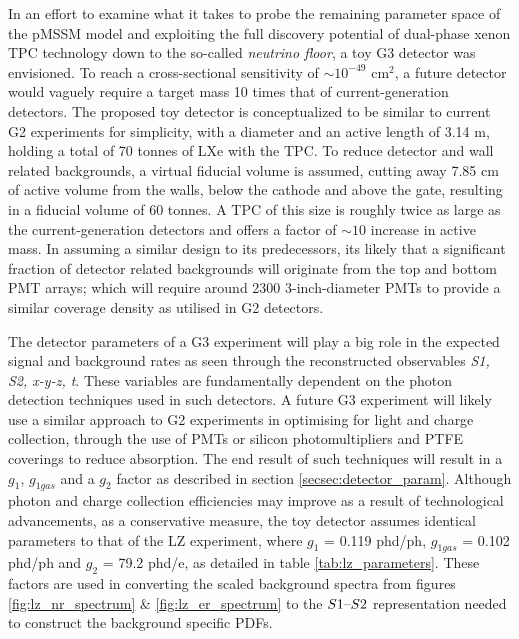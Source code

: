 In an effort to examine what it takes to probe the remaining parameter space of the pMSSM model and exploiting the full discovery potential of dual-phase xenon TPC technology down to the so-called \textit{neutrino floor}, a toy G3 detector was envisioned. To reach a cross-sectional sensitivity of $\sim10^{-49}$ cm$^{2}$, a future detector would vaguely require a target mass 10 times that of current-generation detectors. The proposed toy detector is conceptualized to be similar to current G2 experiments for simplicity, with a diameter and an active length of 3.14 m, holding a total of 70 tonnes of LXe with the TPC. To reduce detector and wall related backgrounds, a virtual fiducial volume is assumed, cutting away 7.85 cm of active volume from the walls, below the cathode and above the gate, resulting in a fiducial volume of 60 tonnes. A TPC of this size is roughly twice as large as the current-generation detectors and offers a factor of $\sim10$ increase in active mass. In assuming a similar design to its predecessors, its likely that a significant fraction of detector related backgrounds will originate from the top and bottom PMT arrays; which will require around 2300 3-inch-diameter PMTs to provide a similar coverage density as utilised in G2 detectors. 

The detector parameters of a G3 experiment will play a big role in the expected signal and background rates as seen through the reconstructed observables \textit{S1, S2, x-y-z, t}. These variables are fundamentally dependent on the photon detection techniques used in such detectors. A future G3 experiment will likely use a similar approach to G2 experiments in optimising for light and charge collection, through the use of PMTs or silicon photomultipliers \cite{Gundacker_2020} and PTFE coverings to reduce absorption. The end result of such techniques will result in a $g_{1}$, $g_{1gas}$ and a $g_{2}$ factor as described in section \ref{secsec:detector_param}. Although photon and charge collection efficiencies may improve as a result of technological advancements, as a conservative measure, the toy detector assumes identical parameters to that of the LZ experiment, where $g_{1}$ = 0.119 phd/ph, $g_{1gas}$ = 0.102 phd/ph and $g_{2}$ = 79.2 phd/e, as detailed in table \ref{tab:lz_parameters}. These factors are used in converting the scaled background spectra from figures \ref{fig:lz_nr_spectrum} \& \ref{fig:lz_er_spectrum} to the $S1\text{--}{}S2$ representation needed to construct the background specific PDFs. 



